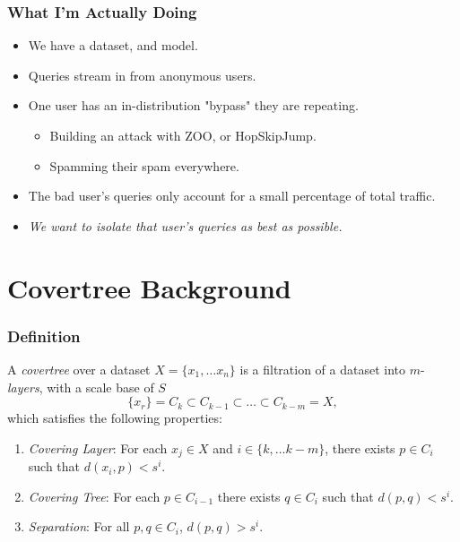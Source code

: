 \documentclass{beamer}
\begin{document}
\begin{frame}
\frametitle{What I'm Actually Doing}
\begin{itemize}
    \item We have a dataset, and model. 
    \item Queries stream in from anonymous users.
    \item One user has an in-distribution "bypass" they are repeating.
    \begin{itemize}
        \item Building an attack with ZOO, or HopSkipJump.
        \item Spamming their spam everywhere.
    \end{itemize}
    \item The bad user's queries only account for a small percentage of total traffic.
    \item \emph{We want to isolate that user's queries as best as possible.}
\end{itemize}
\end{frame}

\section{Covertree Background}

\begin{frame}
    \frametitle{Definition}
    A \emph{covertree} over a dataset $X = \lbrace x_1, \dots x_n \rbrace$ is a filtration of a dataset into $m$-\emph{layers}, with a scale base of $S$
    $$\{x_r\} = C_k \subset C_{k-1} \subset \dots \subset C_{k-m} = X,$$
    which satisfies the following properties:
    \begin{enumerate}
        \item \emph{Covering Layer}: For each $x_j \in X$ and $i \in \{k,\dots k-m\}$, there exists $p \in C_i$ such that $d(x_i,p) < s^i$.
        \item \emph{Covering Tree}: For each $p \in C_{i-1}$ there exists $q \in C_i$ such that $d(p,q)<s^i$.
        \item \emph{Separation}: For all $p,q \in C_i$, $d(p,q) > s^i$.
    \end{enumerate}
\end{frame}
\end{document}
